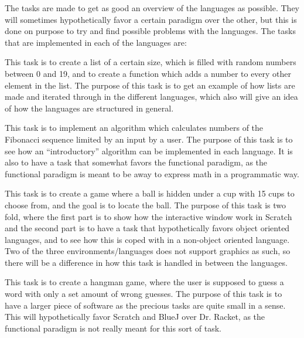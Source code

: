 The tasks are made to get as good an overview of the languages as possible. They will sometimes hypothetically favor a certain paradigm over the other, but this is done on purpose to try and find possible problems with the languages. The tasks that are implemented in each of the languages are:
\begin{description}[style=nextline]
\item[Task 1] This task is to create a list of a certain size, which is filled with random numbers between 0 and 19, and to create a function which adds a number to every other element in the list. The purpose of this task is to get an example of how lists are made and iterated through in the different languages, which also will give an idea of how the languages are structured in general.
\item[Task 2] This task is to implement an algorithm which calculates numbers of the Fibonacci sequence limited by an input by a user. The purpose of this task is to see how an ``introductory'' algorithm can be implemented in each language. It is also to have a task that somewhat favors the functional paradigm, as the functional paradigm is meant to be away to express math in a programmatic way.
\item[Task 3] This task is to create a game where a ball is hidden under a cup with 15 cups to choose from, and the goal is to locate the ball. The purpose of this task is two fold, where the first part is to show how the interactive window work in Scratch and the second part is to have a task that hypothetically favors object oriented languages, and to see how this is coped with in a non-object oriented language. Two of the three environments/languages does not support graphics as such, so there will be a difference in how this task is handled in between the languages.
\item[Task 4] This task is to create a hangman game, where the user is supposed to guess a word with only a set amount of wrong guesses. The purpose of this task is to have a larger piece of software as the precious tasks are quite small in a sense. This will hypothetically favor Scratch and BlueJ over Dr. Racket, as the functional paradigm is not really meant for this sort of task.
\end{description}


